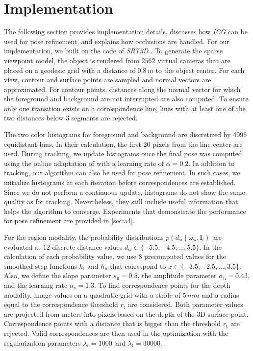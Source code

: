 \documentclass[10pt,twocolumn,letterpaper]{article}
\begin{document}
 

\section{Implementation}\label{sec:i}
The following section provides implementation details, discusses how \textit{ICG} can be used for pose refinement, and explains how occlusions are handled.
For our implementation, we built on the code of \textit{SRT3D} \cite{Stoiber2021}.
To generate the sparse viewpoint model, the object is rendered from $2562$ virtual cameras that are placed on a geodesic grid with a distance of $0.8\,\unit{m}$ to the object center.
For each view, contour and surface points are sampled and normal vectors are approximated.
For contour points, distances along the normal vector for which the foreground and background are not interrupted are also computed.
To ensure only one transition exists on a correspondence line, lines with at least one of the two distances below $3$ segments are rejected.

The two color histograms for foreground and background are discretized by 4096 equidistant bins.
In their calculation, the first 20 pixels from the line center are used.
During tracking, we update histograms once the final pose was computed using the online adaptation of \cite{Bibby2008} with a learning rate of $\alpha = 0.2$.
In addition to tracking, our algorithm can also be used for pose refinement.
In such cases, we initialize histograms at each iteration before correspondences are established.
Since we do not perform a continuous update, histograms do not show the same quality as for tracking.
Nevertheless, they still include useful information that helps the algorithm to converge.
Experiments that demonstrate the performance for pose refinement are provided in \cref{sec:a4}.

For the region modality, the probability distributions $p(d_{\textrm{s}i}\mid\omega_{\textrm{s}i},\pmb{l}_i)$ are evaluated at $12$ discrete distance values $d_{\textrm{s}i}\in\{-5.5,-4.5,\dots,5.5\}$.
In the calculation of each probability value, we use $8$ precomputed values for the smoothed step functions $h_\textrm{f}$ and $h_\textrm{b}$ that correspond to $x\in\{-3.5, -2.5,\dots,3.5\}$.
Also, we define the slope parameter $s_\textrm{h} = 0.5$, the amplitude parameter $\alpha_\textrm{h} = 0.43$, and the learning rate $\alpha_\textrm{s} = 1.3$.
To find correspondence points for the depth modality, image values on a quadratic grid with a stride of $5\,\unit{mm}$ and a radius equal to the correspondence threshold $r_\textrm{t}$ are considered.
Both parameter values are projected from meters into pixels based on the depth of the 3D surface point.
Correspondence points with a distance that is bigger than the threshold $r_\textrm{t}$ are rejected.
Valid correspondences are then used in the optimization with the regularization parameters $\lambda_\textrm{r} = 1000$ and $\lambda_\textrm{t} = 30000$.
\end{document}
